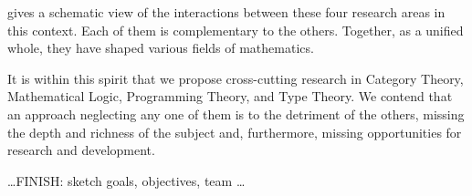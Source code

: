 \documentclass[11pt,twocolumn]{article}
\newenvironment{myitemize}
  {\begin{list}{$\bullet$}
  {\setlength{\topsep}{2pt}
   \setlength{\partopsep}{2pt}
   \setlength{\itemsep}{2.5pt}
   \setlength{\parsep}{2.5pt}
   \setlength{\leftmargin}{1em}
   \setlength{\labelwidth}{.5em}}}
  {\end{list}}
\newcommand{\hide}[1]{}
\begin{document}
gives a schematic view of the interactions between these four research
areas in this context.  Each of them is complementary to the others.
Together, as a unified whole, they have shaped various fields of
mathematics.  
\hide{
Indeed, consider for instance that: 
\begin{myitemize}
\item
  the categorical interpretation of quantifiers as
  adjoints~\cite{LawvereAinF} informed the development of the
  type-theoretic dependent sums and dependent products~\cite{ScottCV};
\item
  type theories are the foundation of programming-language typing
  systems~\cite{Pierce};
\item
  the control operators of programming languages are key to the
  constructive interpretation of classical proofs~\cite{Griffin}; and 
\item
  model-theoretic studies of the polymorphic lambda
  calculus~\cite{GirardSystemF,Reynolds} led to remarkable small complete
  categories~\cite{Hyland}.
\end{myitemize}
}

It is within this spirit that we propose cross-cutting research in
Category Theory, Mathematical Logic, Programming Theory, and Type Theory.
We contend that an approach neglecting any one of them is to the detriment
of the others, missing the depth and richness of the subject and,
furthermore, missing opportunities for research and development.  

{\color{red}\ldots FINISH: sketch goals, objectives, team \ldots}
\end{document}
